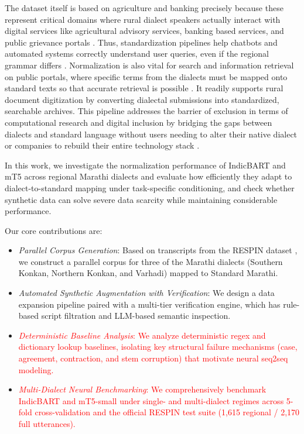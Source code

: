 \documentclass[11pt, a4paper]{article}
\begin{document}
The dataset itself is based on agriculture and banking precisely because these represent critical domains where rural dialect speakers actually interact with digital services like agricultural advisory services, banking based services, and public grievance portals \citep{kumar2025respin}. 
Thus, standardization pipelines help chatbots and automated systems correctly understand user queries, even if the regional grammar differs \citep{blaschke2024what,joshi2025survey}. 
Normalization is also vital for search and information retrieval on public portals, where specific terms from the dialects must be mapped onto standard texts so that accurate retrieval is possible \citep{kumar2024indicdialect}. 
It readily supports rural document digitization by converting dialectal submissions into standardized, searchable archives. 
This pipeline addresses the barrier of exclusion in terms of computational research and digital inclusion by bridging the gaps between dialects and standard language without users needing to alter their native dialect or companies to rebuild their entire technology stack \citep{joshi2020state}.

In this work, we investigate the normalization performance of IndicBART and mT5 across regional Marathi dialects and evaluate how efficiently they adapt to dialect-to-standard mapping under task-specific conditioning, and check whether synthetic data can solve severe data scarcity while maintaining considerable performance. 

Our core contributions are:
\begin{itemize}
    \item {\fontsize{11pt}{14pt}\selectfont\itshape Parallel Corpus Generation}: Based on transcripts from the RESPIN dataset \citep{kumar2025respin}, we construct a parallel corpus for three of the Marathi dialects (Southern Konkan, Northern Konkan, and Varhadi) mapped to Standard Marathi.
    \item {\fontsize{11pt}{14pt}\selectfont\itshape Automated Synthetic Augmentation with Verification}: We design a data expansion pipeline paired with a multi-tier verification engine, which has rule-based script filtration and LLM-based semantic inspection.
    \item \textcolor{red}{{\fontsize{11pt}{14pt}\selectfont\itshape Deterministic Baseline Analysis}: We analyze deterministic regex and dictionary lookup baselines, isolating key structural failure mechanisms (case, agreement, contraction, and stem corruption) that motivate neural seq2seq modeling.}
    \item \textcolor{red}{{\fontsize{11pt}{14pt}\selectfont\itshape Multi-Dialect Neural Benchmarking}: We comprehensively benchmark IndicBART and mT5-small under single- and multi-dialect regimes across 5-fold cross-validation and the official RESPIN test suite (1,615 regional / 2,170 full utterances).}
\end{itemize}
\end{document}
